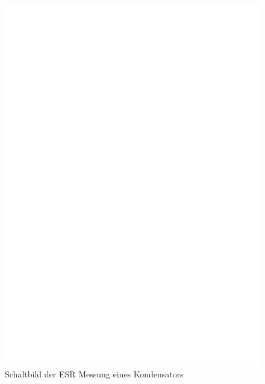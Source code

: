 \begin{figure}[H]
  \centering
    \includegraphics[]{../FIG/Cap_esr.eps}
  \caption{Schaltbild der ESR Messung eines Kondensators}
  \label{fig:Cap_esr}
\end{figure}

